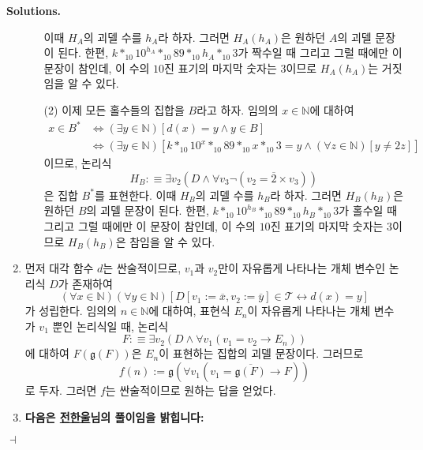 \documentclass[12pt]{paper}
\newcommand{\gnum}{ \mathfrak{g} }
\newenvironment{context}[1][]{\noindent \textbf{{#1}.}}{\hfill $ \dashv $}
\begin{document}
\begin{context}[Solutions]
\begin{enumerate}
\begin{itemize}
        이때 $H_A$의 괴델 수를 $h_A$라 하자.
        그러면 $ H_A \left( h_A \right) $은 원하던 $A$의 괴델 문장이 된다.
        한편, $k *_{10} 10^{h_A} *_{10} 89 *_{10} h_A *_{10} 3$가 짝수일 때 그리고 그럴 때에만 이 문장이 참인데,
        이 수의 $10$진 표기의 마지막 숫자는 $3$이므로 $H_A \left( h_A \right)$는 거짓임을 알 수 있다.
        \item[(2)] 이제 모든 홀수들의 집합을 $B$라고 하자.
        임의의 $x \in \mathbb{N}$에 대하여
        \begin{align*}
          x \in B^{*}
          & \iff \left( \exists y \in \mathbb{N} \right) \left[ d \left( x \right) = y \land y \in B \right] \\
          & \iff \left( \exists y \in \mathbb{N} \right) \left[ k *_{10} 10^{x} *_{10} 89 *_{10} x *_{10} 3 = y \land \left( \forall z \in \mathbb{N} \right) \left[ y \neq 2 z \right] \right]
        \end{align*}
        이므로,
        논리식 $$ H_B : \equiv \exists v_2 \left( D \land \forall v_3 \lnot \left( v_2 = \overline{2} \times v_3 \right) \right) $$은 집합 $B^{*}$를 표현한다.
        이때 $H_B$의 괴델 수를 $h_B$라 하자.
        그러면 $H_B \left( h_B \right)$은 원하던 $B$의 괴델 문장이 된다.
        한편, $k *_{10} 10^{h_B} *_{10} 89 *_{10} h_B *_{10} 3$가 홀수일 때 그리고 그럴 때에만 이 문장이 참인데,
        이 수의 $10$진 표기의 마지막 숫자는 $3$이므로 $H_B \left( h_B \right)$은 참임을 알 수 있다.
      \end{itemize}

      \item 먼저 대각 함수 $d$는 싼술적이므로,
      $v_1$과 $v_2$만이 자유롭게 나타나는 개체 변수인 논리식 $D$가 존재하여
      $$\left( \forall x \in \mathbb{N} \right) \left( \forall y \in \mathbb{N} \right) \left[ D \left[ v_1 := \overline{x} , v_2 := \overline{y} \right] \in \mathcal{T} \leftrightarrow d \left( x \right) = y \right]$$가 성립한다.
      임의의 $n \in \mathbb{N}$에 대하여,
      표현식 $E_{n}$이 자유롭게 나타나는 개체 변수가 $v_1$ 뿐인 논리식일 때,
      논리식 $$ F : \equiv \exists v_2 \left( D \land \forall v_1 \left( v_1 = v_2 \rightarrow E_{n} \right) \right) $$에 대하여
      $F \left( \gnum \left( F \right) \right)$은 $E_{n}$이 표현하는 집합의 괴델 문장이다.
      그러므로 $$ f \left( n \right) := \gnum \left( \forall v_1 \left( v_1 = \overline{\gnum \left( F \right)} \rightarrow F \right) \right) $$로 두자.
      그러면 $f$는 싼술적이므로 원하는 답을 얻었다.

      \item \textbf{다음은 \underline{전한울}님의 풀이임을 밝힙니다:}


\end{enumerate}
\end{context}
\end{document}
